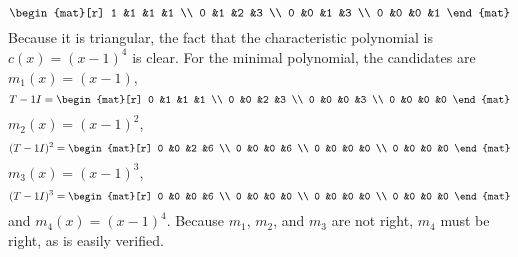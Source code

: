 \begin{exercises}
\begin{answer}
      \begin{equation*}
        \begin{mat}[r]
          1  &1  &1  &1  \\
          0  &1  &2  &3  \\
          0  &0  &1  &3  \\
          0  &0  &0  &1
        \end{mat}
      \end{equation*}
      Because it is triangular, the fact that the characteristic polynomial is
      $c(x)=(x-1)^4$ is clear.
      For the minimal polynomial, the candidates are $m_1(x)=(x-1)$,
      \begin{equation*}
        T-1I=
        \begin{mat}[r]
          0  &1  &1  &1  \\
          0  &0  &2  &3  \\
          0  &0  &0  &3  \\
          0  &0  &0  &0
        \end{mat}
      \end{equation*}
      $m_2(x)=(x-1)^2$, 
      \begin{equation*}
        (T-1I)^2=
        \begin{mat}[r]
          0  &0  &2  &6  \\
          0  &0  &0  &6  \\
          0  &0  &0  &0  \\
          0  &0  &0  &0
        \end{mat}
      \end{equation*}
      $m_3(x)=(x-1)^3$,
      \begin{equation*}
        (T-1I)^3=
        \begin{mat}[r]
          0  &0  &0  &6  \\
          0  &0  &0  &0  \\
          0  &0  &0  &0  \\
          0  &0  &0  &0
        \end{mat}
      \end{equation*}
      and $m_4(x)=(x-1)^4$.
      Because $m_1$, $m_2$, and $m_3$ are not right, $m_4$ must be right,
      as is easily verified.
      

\end{answer}
\end{exercises}
